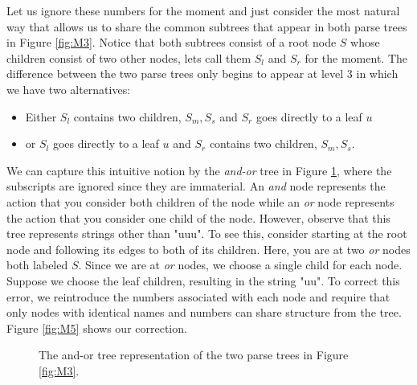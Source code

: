 \documentclass{sigplanconf}
\begin{document}
Let us ignore these numbers for the moment and just consider the most natural way that allows us to share the common subtrees that appear in both parse trees in Figure \ref{fig:M3}. Notice that both subtrees consist of a root node $S$ whose children consist of two other nodes, lets call them $S_l$ and $S_r$ for the moment. The difference between the two parse trees only begins to appear at level $3$ in which we have two alternatives:
\begin{itemize}
\item Either $S_l$ contains two children, $S_m,S_s$ and $S_r$ goes directly to a leaf $u$
\item or $S_l$ goes directly to a leaf $u$ and $S_r$ contains two children, $S_m,S_s$.
\end{itemize}
We can capture this intuitive notion by the \textit{and-or} tree in Figure \ref{fig:M4}, where the subscripts are ignored since they are immaterial. An \textit{and} node represents the action that you consider both children of the node while an \textit{or} node represents the action that you consider one child of the node. However, observe that this tree represents strings other than "uuu". To see this, consider starting at the root node and following its edges to both of its children. Here, you are at two \textit{or} nodes both labeled $S$. Since we are at \textit{or} nodes, we choose a single child for each node. Suppose we choose the leaf children, resulting in the string "uu". To correct this error, we reintroduce the numbers associated with each node and require that only nodes with identical names and numbers can share structure from the tree. Figure \ref{fig:M5} shows our correction.

\begin{figure}
\begin{center}
\caption{The and-or tree representation of the two parse trees in Figure \ref{fig:M3}.} \label{fig:M4}
\end{center}	
\end{figure}
\end{document}
